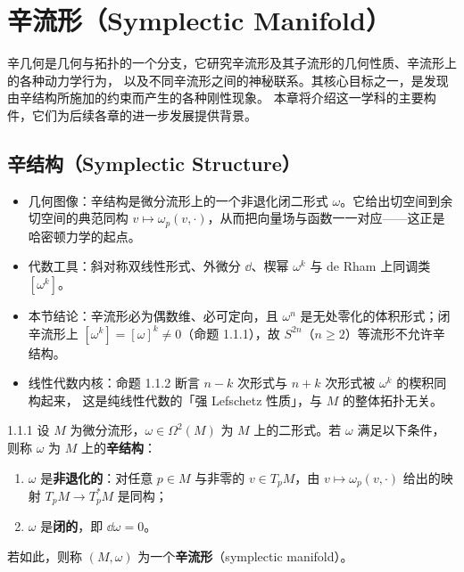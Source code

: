 \chapter{辛流形（Symplectic Manifold）}

辛几何是几何与拓扑的一个分支，它研究辛流形及其子流形的几何性质、辛流形上的各种动力学行为，
以及不同辛流形之间的神秘联系。其核心目标之一，是发现由辛结构所施加的约束而产生的各种刚性现象。
本章将介绍这一学科的主要构件，它们为后续各章的进一步发展提供背景。

\section{辛结构（Symplectic Structure）}

\begin{keytakeaways}
\begin{itemize}
  \item 几何图像：辛结构是微分流形上的一个非退化闭二形式 $\omega$。它给出切空间到余切空间的典范同构
        $v\mapsto\omega_p(v,\cdot)$，从而把向量场与函数一一对应——这正是哈密顿力学的起点。
  \item 代数工具：斜对称双线性形式、外微分 $\dd$、楔幂 $\omega^k$ 与 de Rham 上同调类 $[\omega^k]$。
  \item 本节结论：辛流形必为偶数维、必可定向，且 $\omega^n$ 是无处零化的体积形式；闭辛流形上
        $[\omega^k]=[\omega]^k\neq0$（命题 1.1.1），故 $S^{2n}$（$n\ge2$）等流形不允许辛结构。
  \item 线性代数内核：命题 1.1.2 断言 $n-k$ 次形式与 $n+k$ 次形式被 $\omega^k$ 的楔积同构起来，
        这是纯线性代数的「强 Lefschetz 性质」，与 $M$ 的整体拓扑无关。
\end{itemize}
\end{keytakeaways}

\begin{wdefn}{1.1.1}
设 $M$ 为微分流形，$\omega\in\Omega^2(M)$ 为 $M$ 上的二形式。若 $\omega$ 满足以下条件，则称 $\omega$
为 $M$ 上的\textbf{辛结构}：
\begin{enumerate}[label=(\roman*)]
  \item $\omega$ 是\textbf{非退化的}：对任意 $p\in M$ 与非零的 $v\in T_pM$，由
        $v\mapsto\omega_p(v,\cdot)$ 给出的映射 $T_pM\to T_p^*M$ 是同构；
  \item $\omega$ 是\textbf{闭的}，即 $\dd\omega=0$。
\end{enumerate}
若如此，则称 $(M,\omega)$ 为一个\textbf{辛流形}（symplectic manifold）。
\end{wdefn}

